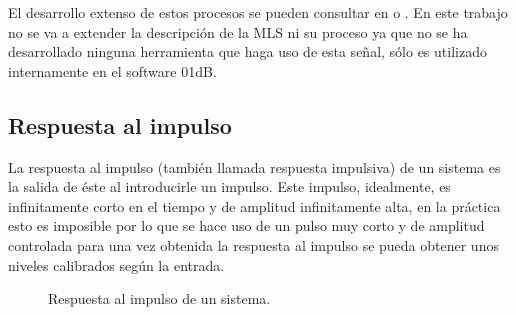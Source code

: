 El desarrollo extenso de estos procesos se pueden consultar en \cite{Cohn1977} o \cite{Sarwate1980}. En este trabajo no se va a extender la descripción de la MLS ni su proceso ya que no se ha desarrollado ninguna herramienta que haga uso de esta señal, sólo es utilizado internamente en el software 01dB.

\subsection{Respuesta al impulso}
\label{respimpulso}

La respuesta al impulso (también llamada respuesta impulsiva) de un sistema es la salida de éste al introducirle un impulso. Este impulso, idealmente, es infinitamente corto en el tiempo y de amplitud infinitamente alta, en la práctica esto es imposible por lo que se hace uso de un pulso muy corto y de amplitud controlada para una vez obtenida la respuesta al impulso se pueda obtener unos niveles calibrados según la entrada.


\begin{figure}[ht]
    \centering
    {
    
    }
    \caption{Respuesta al impulso de un sistema.}
    \label{graf:impulso}
\end{figure}





